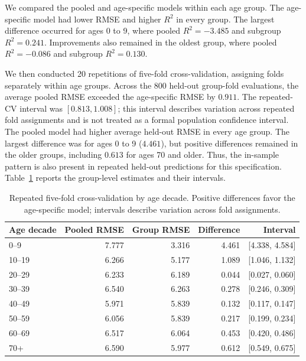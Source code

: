 We compared the pooled and age-specific models within each age group. The age-specific model had lower RMSE and higher $R^2$ in every group. The largest difference occurred for ages 0 to 9, where pooled $R^2=-3.485$ and subgroup $R^2=0.241$. Improvements also remained in the oldest group, where pooled $R^2=-0.086$ and subgroup $R^2=0.130$.

We then conducted 20 repetitions of five-fold cross-validation, assigning folds separately within age groups. Across the 800 held-out group-fold evaluations, the average pooled RMSE exceeded the age-specific RMSE by $0.911$. The repeated-CV interval was $[0.813, 1.008]$; this interval describes variation across repeated fold assignments and is not treated as a formal population confidence interval. The pooled model had higher average held-out RMSE in every age group. The largest difference was for ages 0 to 9 ($4.461$), but positive differences remained in the older groups, including $0.613$ for ages 70 and older. Thus, the in-sample pattern is also present in repeated held-out predictions for this specification. Table~\ref{tab:nhanes-cv} reports the group-level estimates and their intervals.

\begin{table}[H]
\centering
\small
\setlength{\tabcolsep}{6pt}
\caption{Repeated five-fold cross-validation by age decade. Positive differences favor the age-specific model; intervals describe variation across fold assignments.}
\label{tab:nhanes-cv}
\begin{tabular}{lrrrr}
\toprule
Age decade & Pooled RMSE & Group RMSE & Difference & Interval \\
\midrule
0--9   & 7.777 & 3.316 & 4.461 & [4.338, 4.584] \\
10--19 & 6.266 & 5.177 & 1.089 & [1.046, 1.132] \\
20--29 & 6.233 & 6.189 & 0.044 & [0.027, 0.060] \\
30--39 & 6.540 & 6.263 & 0.278 & [0.246, 0.309] \\
40--49 & 5.971 & 5.839 & 0.132 & [0.117, 0.147] \\
50--59 & 6.056 & 5.839 & 0.217 & [0.199, 0.234] \\
60--69 & 6.517 & 6.064 & 0.453 & [0.420, 0.486] \\
70+    & 6.590 & 5.977 & 0.612 & [0.549, 0.675] \\
\bottomrule
\end{tabular}
\end{table}